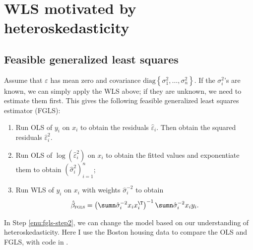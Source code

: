 \section{WLS motivated by heteroskedasticity}


\subsection{Feasible generalized least squares}\label{section::fgls}

Assume that $\varepsilon$ has mean zero and covariance $\text{diag}\left\{ \sigma_{1}^{2},\ldots,\sigma_{n}^{2}\right\} $.
If the $\sigma_{i}^{2}$'s are known, we can simply apply the WLS
above; if they are unknown, we need to estimate them first. This gives
the following feasible generalized least squares estimator (FGLS):
\begin{enumerate}
\item Run OLS of $y_i$ on $x_i$ to obtain the residuals $\hat{\varepsilon}_i$. Then obtain the squared residuals $\hat{\varepsilon}_i^2.$

\item \label{enu:fgls-step2}Run OLS of $\log(\hat{\varepsilon}^{2}_i)$ on
$x_i$ to obtain the fitted values and exponentiate them to obtain $(\hat{\sigma}_{i}^{2})_{i=1}^{n}$;
\item Run WLS of $y_i$ on $x_i$ with weights $ \hat{\sigma}_{i}^{-2} $
to obtain
\[
\hat{\beta}_{\textsc{fgls}}=\left(\sumn\hat{\sigma}_{i}^{-2}x_{i}x_{i}^{\T}\right)^{-1}\sumn\hat{\sigma}_{i}^{-2}x_{i}y_{i}.
\]
\end{enumerate}
%
In Step \ref{enu:fgls-step2}, we can change the model based
on our understanding of heteroskedasticity. Here I use the Boston housing data to compare the OLS and FGLS, with  code in .

